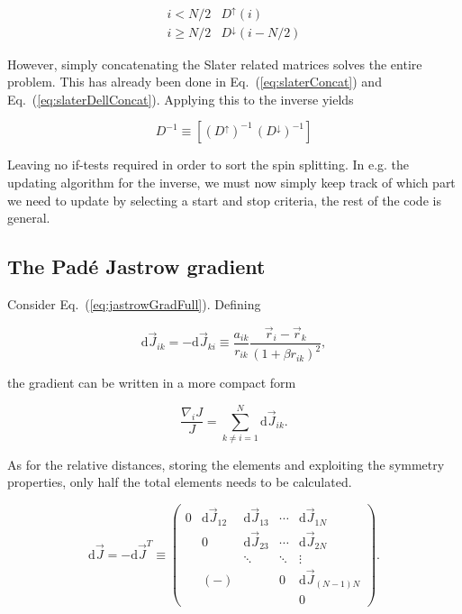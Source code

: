 \begin{equation}
\begin{array}{cl}
 i < N/2 & D^\uparrow(i) \\
 i \ge N/2 & D^\downarrow(i - N/2)
\end{array} 
\end{equation}

However, simply concatenating the Slater related matrices solves the entire problem. This has already been done in Eq.~(\ref{eq:slaterConcat}) and Eq.~(\ref{eq:slaterDellConcat}). Applying this to the inverse yields

\begin{equation}
 D^{-1} \equiv \left[(D^\uparrow)^{-1}\,(D^\downarrow)^{-1}\right]
\end{equation}

Leaving no if-tests required in order to sort the spin splitting. In e.g. the updating algorithm for the inverse, we must now simply keep track of which part we need to update by selecting a start and stop criteria, the rest of the code is general.

\subsection{The Padé Jastrow gradient}
\label{sec:optJastGrad}

Consider Eq.~(\ref{eq:jastrowGradFull}). Defining

\begin{equation}
 \mathrm{d}\vec J_{ik} = -\mathrm{d}\vec J_{ki} \equiv \frac{a_{ik}}{r_{ik}}\frac{\vec r_i - \vec r_k}{(1 + \beta r_{ik})^2},
\end{equation}

the gradient can be written in a more compact form

\begin{equation}
 \frac{\nabla_i J}{J} = \sum_{k \ne i = 1}^N \mathrm{d}\vec J_{ik}.
\end{equation}

As for the relative distances, storing the elements and exploiting the symmetry properties, only half the total elements needs to be calculated. 

\begin{equation}
\label{eq:jastrowDJ}
 \mathrm{d}\vec J = -\mathrm{d}\vec J^T \equiv \left( \begin{array}{ccccc}
0 & \mathrm{d}\vec J_{12} & \mathrm{d}\vec J_{13} & \cdots & \mathrm{d}\vec J_{1N} \\
 & 0 & \mathrm{d}\vec J_{23} & \cdots & \mathrm{d}\vec J_{2N}  \\
 &  & \ddots & \ddots & \vdots \\
 & (-) &  & 0 & \mathrm{d}\vec J_{(N-1)N} \\
 &  &  &  & 0\end{array} \right).
\end{equation}

